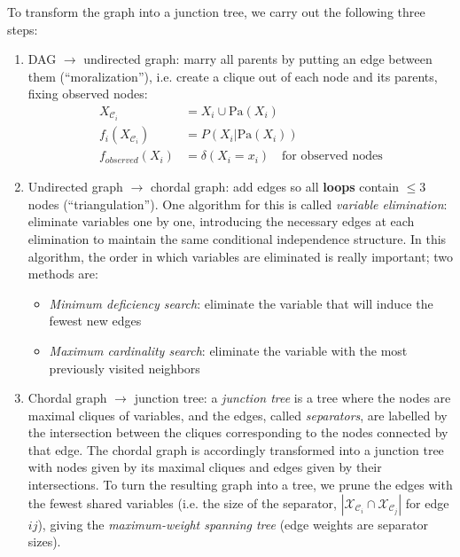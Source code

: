 \documentclass[a4paper]{article}
\begin{document}
To transform the graph into a junction tree, we carry out the following three steps:
\begin{enumerate}
\item DAG $\rightarrow$ undirected graph: marry all parents by putting an edge between them (``moralization''), i.e. create a clique out of each node and its parents, fixing observed nodes:
\begin{align*}
X_{\mathcal{C}_i} &= X_i \cup \textrm{Pa}(X_i) \\
f_i(X_{\mathcal{C}_i}) &= P(X_i|\textrm{Pa}(X_i)) \\
f_{observed}(X_i) &= \delta(X_i = x_i) \quad\text{for observed nodes}
\end{align*}
\item Undirected graph $\rightarrow$ chordal graph: add edges so all \textbf{loops} contain $\leq 3$ nodes (``triangulation''). One algorithm for this is called \emph{variable elimination}: eliminate variables one by one, introducing the necessary edges at each elimination to maintain the same conditional independence structure. In this algorithm, the order in which variables are eliminated is really important; two methods are:
\begin{itemize}
\item \emph{Minimum deficiency search}: eliminate the variable that will induce the fewest new edges
\item \emph{Maximum cardinality search}: eliminate the variable with the most previously visited neighbors 
\end{itemize}
\item Chordal graph $\rightarrow$ junction tree: a \emph{junction tree} is a tree where the nodes are maximal cliques of variables, and the edges, called \emph{separators}, are labelled by the intersection between the cliques corresponding to the nodes connected by that edge. The chordal graph is accordingly transformed into a junction tree with nodes given by its maximal cliques and edges given by their intersections. To turn the resulting graph into a tree, we prune the edges with the fewest shared variables (i.e. the size of the separator, $|\mathcal{X}_{\mathcal{C}_i} \cap \mathcal{X}_{\mathcal{C}_j}|$ for edge $ij$), giving the \emph{maximum-weight spanning tree} (edge weights are separator sizes).
\end{enumerate}
\end{document}
